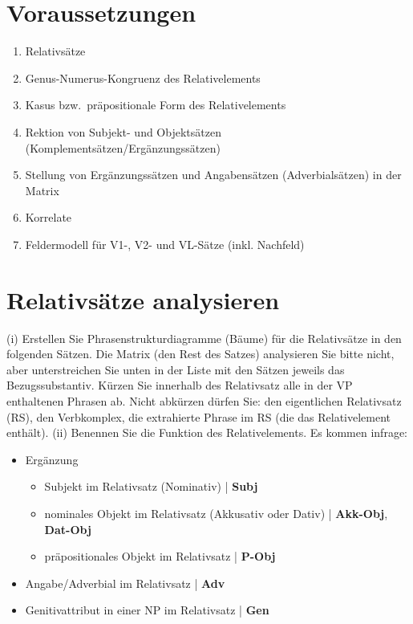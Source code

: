 \section*{Voraussetzungen}

\begin{enumerate}\Lf
  \item Relativsätze
  \item Genus-Numerus-Kongruenz des Relativelements
  \item Kasus bzw.\ präpositionale Form des Relativelements
  \item Rektion von Subjekt- und Objektsätzen (Komplementsätzen\slash Ergänzungssätzen) 
  \item Stellung von Ergänzungssätzen und Angabensätzen (Adverbialsätzen) in der Matrix
  \item Korrelate
  \item Feldermodell für V1-, V2- und VL-Sätze (inkl. Nachfeld)
\end{enumerate}

\section{Relativsätze analysieren}\label{sec:relativ}

(i) Erstellen Sie Phrasenstrukturdiagramme (Bäume) für die Relativsätze in den folgenden Sätzen.
Die Matrix (den Rest des Satzes) analysieren Sie bitte nicht, aber unterstreichen Sie unten in der Liste mit den Sätzen jeweils das Bezugssubstantiv.
Kürzen Sie innerhalb des Relativsatz alle in der VP enthaltenen Phrasen ab.
Nicht abkürzen dürfen Sie: den eigentlichen Relativsatz (RS), den Verbkomplex, die extrahierte Phrase im RS (die das Relativelement enthält).
(ii) Benennen Sie die Funktion des Relativelements.
Es kommen infrage:

\begin{itemize}\Lf
  \item Ergänzung
    \begin{itemize}\Lf
      \item Subjekt im Relativsatz (Nominativ) | \textbf{Subj}
      \item nominales Objekt im Relativsatz (Akkusativ oder Dativ) | \textbf{Akk-Obj}, \textbf{Dat-Obj}
      \item präpositionales Objekt im Relativsatz | \textbf{P-Obj}
    \end{itemize}
  \item Angabe\slash Adverbial im Relativsatz | \textbf{Adv}
  \item Genitivattribut in einer NP im Relativsatz | \textbf{Gen}
\end{itemize}

